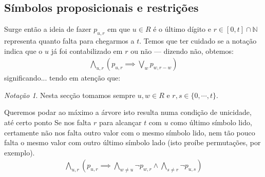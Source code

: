 \documentclass[a4paper,12pt]{article}
\theoremstyle{definition}
\theoremstyle{theorem}
\theoremstyle{remark}
\newtheorem{notç}[defn]{Notação}
\newcommand{\seta}{\draw[-{>[scale=2,width=2]},line width=0.5pt]}
\begin{document}
\subsection{Símbolos proposicionais e restrições}
Surge então a ideia de fazer $p_{u,r}$ em que $u\in R$ é o último dígito e
$r\in [0,t]\cap\mathbb N$ representa quanto falta para chegarmos a $t$.
Temos que ter cuidado se a notação indica que o $u$ já foi contabilizado em $r$
ou não \---- dizendo não, obtemos:
\begin{align}
   \bigwedge_{u,r}\left( p_{u,r}
   \implies
   \bigvee_{w}p_{w,r-w}
   \right)
\end{align}
significando...
tendo em atenção que:
\begin{notç}
   Nesta secção tomamos sempre $u,w\in R$ e $r,s\in\{0,\cdots,t\}$.
\end{notç}

Queremos podar ao máximo a árvore \label{...}
isto resulta numa condição de unicidade, até certo ponto
Se nos falta $r$ para alcançar $t$ com $u$ como último símbolo lido,
certamente não nos falta outro valor com o mesmo símbolo lido,
nem tão pouco falta o mesmo valor com outro último símbolo lado
(isto proíbe permutações, por exemplo).
\begin{align}
      \bigwedge_{u,r}\left( p_{u,r}
   \implies
      \bigwedge_{w\neq u}\lnot p_{w,r}
         \land
      \bigwedge_{s\neq r}\lnot p_{u,s}
   \right)
\end{align}


\begin{figure}%
\begin{minipage}{0.4\textwidth}
   \centering
\end{minipage}
\hfill
\begin{minipage}{0.4\textwidth}
\end{minipage}
\end{figure}
\end{document}
